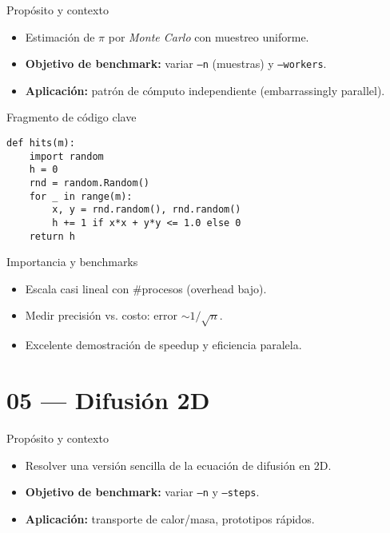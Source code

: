 \documentclass[aspectratio=169,professionalfonts]{beamer}
\begin{document}
\begin{frame}{Propósito y contexto}
\begin{itemize}
  \item Estimación de \(\pi\) por \textit{Monte Carlo} con muestreo uniforme.
  \item \textbf{Objetivo de benchmark:} variar \texttt{--n} (muestras) y \texttt{--workers}.
  \item \textbf{Aplicación:} patrón de cómputo independiente (embarrassingly parallel).
\end{itemize}
\end{frame}

\begin{frame}[fragile]{Fragmento de código clave}
\begin{verbatim}
def hits(m):
    import random
    h = 0
    rnd = random.Random()
    for _ in range(m):
        x, y = rnd.random(), rnd.random()
        h += 1 if x*x + y*y <= 1.0 else 0
    return h
\end{verbatim}
\end{frame}

\begin{frame}{Importancia y benchmarks}
\begin{itemize}
  \item Escala casi lineal con \#procesos (overhead bajo).
  \item Medir precisión vs. costo: error \(\sim 1/\sqrt{n}\).
  \item Excelente demostración de speedup y eficiencia paralela.
\end{itemize}
\end{frame}

\section{05 — Difusión 2D}

\begin{frame}{Propósito y contexto}
\begin{itemize}
  \item Resolver una versión sencilla de la ecuación de difusión en 2D.
  \item \textbf{Objetivo de benchmark:} variar \texttt{--n} y \texttt{--steps}.
  \item \textbf{Aplicación:} transporte de calor/masa, prototipos rápidos.
\end{itemize}
\end{frame}
\end{document}
